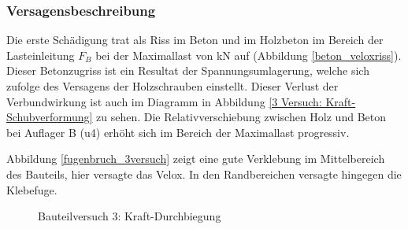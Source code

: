 \subsubsection{Versagensbeschreibung}

Die erste Schädigung trat als Riss im Beton und im Holzbeton im Bereich der Lasteinleitung $F_{B}$ bei der Maximallast von \unit[58]{kN} auf (Abbildung \ref{beton_veloxriss}). Dieser Betonzugriss ist ein Resultat der Spannungsumlagerung, welche sich zufolge des Versagens der Holzschrauben einstellt. Dieser Verlust der Verbundwirkung ist auch im Diagramm in Abbildung \ref{3 Versuch: Kraft-Schubverformung} zu sehen. Die Relativverschiebung zwischen Holz und Beton bei Auflager B (u4) erhöht sich im Bereich der Maximallast progressiv.

Abbildung \ref{fugenbruch_3versuch} zeigt eine gute Verklebung im Mittelbereich des Bauteils, hier versagte das Velox. In den Randbereichen versagte hingegen die Klebefuge. 


\begin{figure}
\begin{center}
\caption{Bauteilversuch 3: Kraft-Durchbiegung}
\label{3 Versuch: Kraft-Durchbiegung}
\end{center}
\end{figure}


